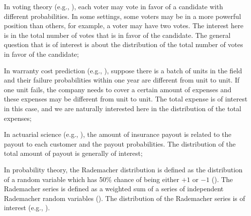 \documentclass[12pt]{article}
\begin{document}
\begin{inparaitem}
\item In voting theory (e.g., ), each voter may vote in favor of a candidate with different probabilities. In some settings, some voters may be in a more powerful position than others, for example, a voter may have two votes. The interest here is in the total number of votes that is in favor of the candidate. The general question that is of interest is about the distribution of the total number of votes in favor of the candidate;

\item In warranty cost prediction (e.g., ), suppose there is a batch of units in the field and their failure probabilities within one year are different from unit to unit. If one unit fails, the company needs to cover a certain amount of expenses and these expenses may be different from unit to unit. The total expense is of interest in this case, and we are naturally interested here in the distribution of the total expenses;

\item In actuarial science (e.g., ), the amount of insurance payout is related to the payout to each customer and the payout probabilities. The distribution of the total amount of payout is generally of interest;

\item In probability theory, the Rademacher distribution is defined as the distribution of a random variable which has 50\% chance of being either $+1$ or $-1$ (). The Rademacher series is defined as a weighted sum of a series of independent Rademacher random variables (). The distribution of the Rademacher series is of interest (e.g., ).

\end{inparaitem}
\end{document}
